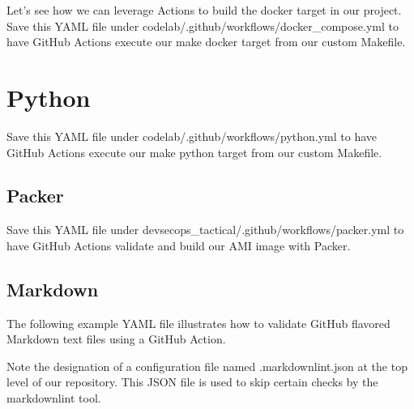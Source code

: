 Let's see how we can leverage Actions to build the docker target in our
project. Save this YAML file under
codelab/.github/workflows/docker\_compose.yml to have GitHub Actions
execute our make docker target from our custom Makefile.

%	


\section{Python}

Save this YAML file under codelab/.github/workflows/python.yml to have
GitHub Actions execute our make python target from our custom Makefile.

%	

\subsection{Packer}

Save this YAML file under devsecops\_tactical/.github/workflows/packer.yml to have
GitHub Actions validate and build our AMI image with Packer.

%	

\subsection{Markdown}

The following example YAML file illustrates how to validate GitHub
flavored Markdown text files using a GitHub Action.

%	

\justify
Note the designation of a configuration file named .markdownlint.json at
the top level of our repository. This JSON file is used to skip certain
checks by the markdownlint tool.

